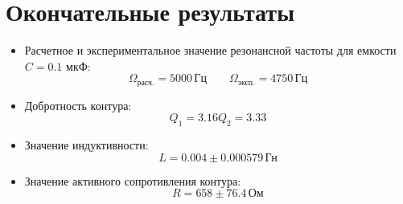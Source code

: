 \section{Окончательные результаты}
\begin{itemize}
  \item Расчетное и экспериментальное значение
    резонансной частоты для емкости $C = 0.1$ мкФ:
    \[
      \Omega_{\text{расч.}} = 5000 \, \text{Гц}
      \qquad
      \Omega_{\text{эксп.}} = 4750 \, \text{Гц}
    \]

  \item Добротность контура:
    \[
      Q_1 = 3.16
      Q_2 = 3.33
    \]
  \item Значение индуктивности:
    \[
      L = 0.004 \pm 0.000579 \, \text{Гн}
    \]
  \item Значение активного сопротивления контура:
    \[
      R = 658 \pm 76.4 \, \text{Ом}
    \]
\end{itemize} 
